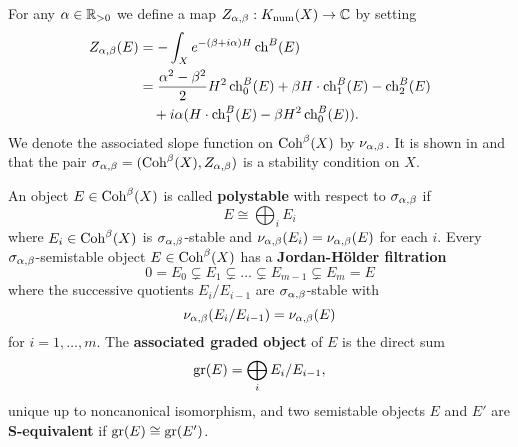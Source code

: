 \documentclass[letterpaper,11pt]{amsart}%
\theoremstyle{remark}
\begin{document}
For any $\alpha \in \mathbb{R}_{>0}$ we define a map $Z_{\alpha,\beta}: K_{\mathrm{num}}(X) \to \mathbb{C}$ by setting
\begin{align*}
    Z_{\alpha, \beta}(E) & = -\int_X e^{-(\beta + i \alpha)H} \operatorname{\mathrm{ch}}^B(E) \\
    & = \frac{\alpha^2 - \beta^2}{2} H^2 \operatorname{\mathrm{ch}}^B_0(E) + \beta H\cdot\operatorname{\mathrm{ch}}^B_1(E) - \operatorname{\mathrm{ch}}^B_2(E) \\
    & \quad  + i\alpha(H \cdot \operatorname{\mathrm{ch}}^B_1(E) - \beta H^2 \operatorname{\mathrm{ch}}^B_0(E)).
\end{align*}
We denote the associated slope function on $\mathrm{Coh}^\beta(X)$ by $\nu_{\alpha,\beta}$. It is shown in \cite{bridgelandK3} and \cite{ABL13} that the pair $\sigma_{\alpha,\beta} = (\mathrm{Coh}^\beta(X), Z_{\alpha,\beta})$ is a stability condition on $X$. 

An object $E \in \mathrm{Coh}^\beta(X)$ is called \textbf{polystable} with respect to $\sigma_{\alpha,\beta}$ if 
\[ E \cong \bigoplus_i E_i \] 
where $E_i \in \mathrm{Coh}^\beta(X)$ is $\sigma_{\alpha,\beta}$-stable and $\nu_{\alpha,\beta}(E_i) = \nu_{\alpha,\beta}(E)$ for each $i$. Every $\sigma_{\alpha,\beta}$-semistable object $E \in \mathrm{Coh}^\beta(X)$ has a \textbf{Jordan-H\"older filtration}
\[ 0 = E_0 \subsetneq E_1 \subsetneq \ldots \subsetneq E_{m-1} \subsetneq E_m = E \]
where the successive quotients $E_i/E_{i-1}$ are $\sigma_{\alpha,\beta}$-stable with 
\[ \nu_{\alpha,\beta}(E_i/E_{i-1}) = \nu_{\alpha,\beta}(E) \] 
for $i = 1,\ldots,m$. The \textbf{associated graded object} of $E$ is the direct sum 
\[ \operatorname{\mathrm{gr}}(E) = \bigoplus_i E_i/E_{i-1}, \] 
unique up to noncanonical isomorphism, and two semistable objects $E$ and $E'$ are \textbf{S-equivalent} if $\operatorname{\mathrm{gr}}(E) \cong \operatorname{\mathrm{gr}}(E')$.
\end{document}
